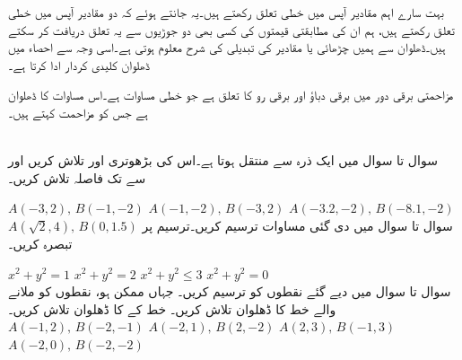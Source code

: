 بہت سارے اہم مقادیر  آپس میں خطی تعلق رکھتے ہیں۔یہ جانتے ہوئے کہ دو مقادیر آپس میں خطی تعلق رکھتے ہیں، ہم ان کی مطابقتی قیمتوں کی کسی بھی دو جوڑیوں سے یہ تعلق دریافت کر سکتے ہیں۔ڈھلوان سے ہمیں چڑھائی  یا مقادیر کی تبدیلی کی شرح معلوم ہوتی ہے۔اسی وجہ سے  احصاء میں ڈھلوان کلیدی کردار ادا کرتا ہے۔ 

مزاحمتی برقی دور میں برقی دباؤ  اور برقی رو  کا تعلق  ہے جو خطی مساوات ہے۔اس مساوات کا ڈھلوان  ہے جس کو مزاحمت کہتے ہیں۔

\\
سوال  تا سوال  میں ایک ذرہ  سے  منتقل ہوتا ہے۔اس کی بڑھوتری  اور  تلاش کریں اور  سے  تک فاصلہ تلاش کریں۔

$A(-3,2),\, B(-1,-2)$
$A(-1,-2),\, B(-3,2)$
$A(-3.2,-2),\, B(-8.1,-2)$
$A(\sqrt{2},4),\, B(0,1.5)$
سوال  تا سوال  میں دی گئی مساوات ترسیم کریں۔ترسیم پر تبصرہ کریں۔

$x^2+y^2=1$
$x^2+y^2=2$
$x^2+y^2\le 3$
$x^2+y^2=0$
\\
سوال  تا سوال  میں دیے گئے نقطوں کو ترسیم کریں۔ جہاں ممکن ہو، نقطوں کو ملانے والے خط کا  ڈھلوان تلاش کریں۔ خط  کے  کا  ڈھلوان تلاش کریں۔\\

$A(-1,2),\,B(-2,-1)$
$A(-2,1),\,B(2,-2)$
$A(2,3),\,B(-1,3)$
$A(-2,0),\,B(-2,-2)$

